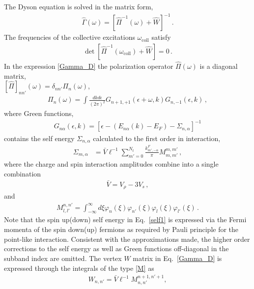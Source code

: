 The Dyson equation is solved  in the matrix form,
\begin{align}\label{Gamma_D}
\hat{\Gamma}(\omega) = \left[ \hat{\Pi}^{-1}(\omega) + \hat{W} \right]^{-1}\, .
\end{align}
The frequencies of the collective excitations $\omega_{\mathrm{coll}}$ satisfy 
\begin{align}\label{det}
\det \left[ \hat{\Pi}^{-1}(\omega_{\mathrm{coll}}) + \hat{W} \right] = 0\, .
\end{align}
In the expression \eqref{Gamma_D} the polarization operator $\hat{\Pi}(\omega)$ is a diagonal matrix,\\
$\left[\hat{\Pi}\right]_{nn'}(\omega) = \delta_{nn'} \Pi_{n}(\omega)$,
\begin{align}\label{Polarization}
\Pi_{n}(\omega) = 
\int \frac{d k d \epsilon}{ (2 \pi)^2 }
G_{n+1,+1}(\epsilon+\omega,k)
G_{n,-1}(\epsilon,k)\, ,
\end{align}
where Green functions,
\begin{align}\label{Green}
G_{n\alpha}(\epsilon,k) = \left[ \epsilon - (E_{n\alpha}(k)-E_F)   - \Sigma_{n,\alpha}\right]^{-1}  
\end{align}
contains the self energy $\Sigma_{n,\alpha}$ calculated to the first order in interaction, 
\begin{align}\label{self1}
\Sigma_{m,\alpha} & =
\bar{V} \ell^{-1} \sum_{m'=0}^{N_t} \frac{k^F_{m',-\alpha}}{ \pi } M^{m,m'}_{m,m'} \, ,
\end{align}
where the charge and spin interaction amplitudes combine into a single combination 
\begin{align}\label{bar_V}
\bar{V} = V_{\rho}- 3 V_s \, ,
\end{align}
 and 
\begin{align}\label{M}
M^{n,n'}_{l,l'} = \int_{-\infty}^{\infty} d \xi \varphi_n(\xi) \varphi_{n'}(\xi) \varphi_l(\xi) \varphi_{l'}(\xi)\, . 
\end{align}
Note that the spin up(down) self energy in Eq.~\eqref{self1} is expressed via the Fermi momenta of the spin down(up) fermions as required by Pauli principle for the point-like interaction.
Consistent with the approximations made, the higher order corrections to the self energy as well as Green functions off-diagonal in the subband index are omitted.
The vertex $\hat{W}$ matrix in Eq.~\eqref{Gamma_D} is expressed through the integrals of the type \eqref{M} as 
\begin{align}\label{W}
W_{n,n'} =\bar{V} \ell^{-1} M^{n+1,n'+1}_{n,n'},
\end{align}



